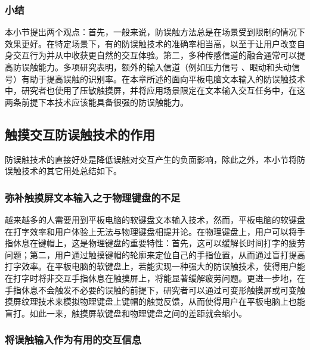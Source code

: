 \subsubsection{小结}

本小节提出两个观点：首先，一般来说，防误触方法总是在场景受到限制的情况下效果更好。在特定场景下，有的防误触技术的准确率相当高，以至于让用户改变自身交互行为并从中收获更自然的交互体验\cite{2013-TapBoard,2016-TapBoard2,2014-PenMightier}。第二，多种传感信道的融合通常可以提高防误触能力。多项研究表明，额外的输入信道（例如压力信号 \cite{2015-GestureOn}、眼动和头动信号\cite{2020-TabletopTouch}）有助于提高误触的识别率。在本章所述的面向平板电脑文本输入的防误触技术中，研究者也使用了压敏触摸屏，并将应用场景限定在文本输入交互任务中，在这两条前提下本技术应该能具备很强的防误触能力。

\subsection{触摸交互防误触技术的作用}

防误触技术的直接好处是降低误触对交互产生的负面影响，除此之外，本小节将防误触技术的其它用处总结如下。

\subsubsection{弥补触摸屏文本输入之于物理键盘的不足}

越来越多的人需要用到平板电脑的软键盘文本输入技术\cite{2018-Japanese}，然而，平板电脑的软键盘在打字效率\cite{1991-Improving, findlater2011typing, 2010-Keyboard}和用户体验\cite{2014-Differences, lu2017blindtype, 2010-NoLook, 2010-Eyes}上无法与物理键盘相提并论。在物理键盘上，用户可以将手指休息在键帽上，这是物理键盘的重要特性：首先，这可以缓解长时间打字的疲劳问题\cite{2013-TapBoard}；第二，用户通过触摸键帽的轮廓来定位自己的手指位置，从而通过盲打提高打字效率\cite{2010-Warning, 1995-Use, 2011-Hierarchical, 2015-Haptic}。在平板电脑的软键盘上，若能实现一种强大的防误触技术，使得用户能在打字时将非交互手指休息在触摸屏上，将能显著缓解疲劳问题。更进一步地，在手指休息不会触发不必要的误触的前提下，研究者可以通过可变形触摸屏\cite{Website-Tactus}或可变触摸屏纹理技术\cite{2011-Stimtac, 2010-TeslaTouch, 2011-Enhancing}来模拟物理键盘上键帽的触觉反馈，从而使得用户在平板电脑上也能盲打。如此一来，触摸屏软键盘和物理键盘之间的差距就会缩小。

\subsubsection{将误触输入作为有用的交互信息}

